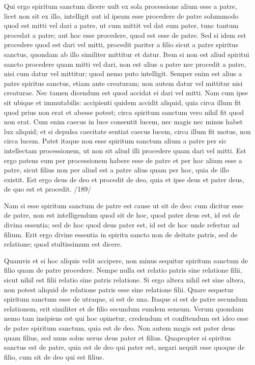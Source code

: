 Qui ergo spiritum sanctum dicere uult ex sola processione alium esse a patre, licet non sit ex illo, intelligit aut id ipsum esse procedere de patre solummodo quod est mitti vel dari a patre, ut cum mittit vel dat eum pater, tunc tantum procedat a patre; aut hoc esse procedere, quod est esse de patre. Sed si idem est procedere quod est dari vel mitti, procedit pariter a filio sicut a patre spiritus sanctus, quondam ab illo similiter mittitur et datur. Item si non est aliud spiritui sancto procedere quam mitti vel dari, non est alius a patre nec procedit a patre, nisi cum datur vel mittitur; quod nemo puto intelligit. Semper enim est alius a patre spiritus sanctus, etiam ante creaturam; non autem datur vel mittitur nisi creaturae. Nec tamen dicendum est quod accidat ei dari vel mitti. Nam cum ipse sit ubique et immutabilis: accipienti quidem accidit aliquid, quia circa illum fit quod prius non erat et abesse potest; circa spiritum sanctum vero nihil fit quod non erat. Cum enim caecus in luce consentit lucem, nec magis nec minus habet lux aliquid; et si depulsa caecitate sentiat caecus lucem, circa illum fit motus, non circa lucem. Patet itaque non esse spiritum sanctum alium a patre per sic intellectam processionem, ut non sit aliud illi procedere quam dari vel mitti. Est ergo patens eum per processionem habere esse de patre et per hoc alium esse a patre, sicut filius non per aliud est a patre alius quam per hoc, quia de illo existit. Est ergo deus de deo et procedit de deo, quia et ipse deus et pater deus, de quo est et procedit. /189/

Nam si esse spiritum sanctum de patre est cause ut sit de deo: cum dicitur esse de patre, non est intelligendum quod sit de hoc, quod pater deus est, id est de divina essentia; sed de hoc quod deus pater est, id est de hoc unde refertur ad filium. Erit ergo divine essentia in spiritu sancto non de deitate patris, sed de relatione; quod stultissimum est dicere.

Quamvis et si hoc aliquis velit accipere, non minus sequitur spiritum sanctum de filio quam de patre procedere. Nempe nulla est relatio patris sine relatione filii, sicut nihil est filii relatio sine patris relatione. Si ergo altera nihil est sine altera, non potest aliquid de relatione patris esse sine relatione filii. Quare sequetur spiritum sanctum esse de utraque, si est de una. Itaque si est de patre secundum relationem, erit similiter et de filio secundum eundem sensum. Verum quondam nemo tam insipiens est qui hoc opinetur, credendum et confitendum est ideo esse de patre spiritum sanctum, quia est de deo. Non autem magis est pater deus quam filius, sed unus solus uerus deus pater et filius. Quapropter si spiritus sanctus est de patre, quia est de deo qui pater est, negari nequit esse quoque de filio, cum sit de deo qui est filius.
